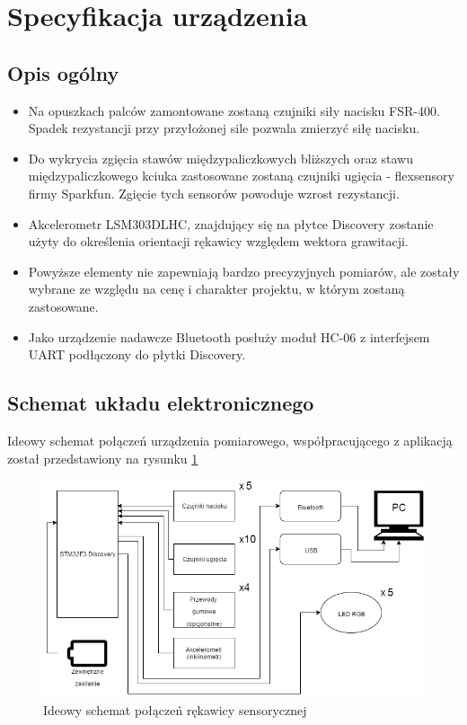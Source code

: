 \documentclass[12pt,a4paper]{article}
\begin{document}
\section{Specyfikacja urządzenia}

\subsection{Opis ogólny}
\begin{itemize}
\item Na opuszkach palców zamontowane zostaną czujniki siły nacisku FSR-400. Spadek rezystancji przy przyłożonej sile pozwala zmierzyć siłę nacisku.
\item Do wykrycia zgięcia stawów międzypaliczkowych bliższych oraz stawu międzypaliczkowego kciuka zastosowane zostaną czujniki ugięcia - flexsensory firmy Sparkfun. Zgięcie tych sensorów powoduje wzrost rezystancji.
\item Akcelerometr LSM303DLHC, znajdujący się na płytce Discovery zostanie użyty do określenia orientacji rękawicy względem wektora grawitacji.
\item Powyższe elementy nie zapewniają bardzo precyzyjnych pomiarów, ale zostały wybrane ze względu na cenę i charakter projektu, w którym zostaną zastosowane.
\item Jako urządzenie nadawcze Bluetooth posłuży moduł HC-06 z interfejsem UART podłączony do płytki Discovery.
\end{itemize}

\subsection{Schemat układu elektronicznego}
Ideowy schemat połączeń urządzenia pomiarowego, współpracującego z aplikacją został przedstawiony na rysunku \ref{fig:ideascheme}
\begin{figure}[!htb]
\centering
\includegraphics[width=\textwidth]{./SchematIdeowy.png}
\caption{Ideowy schemat połączeń rękawicy sensorycznej\label{fig:ideascheme}}
\end{figure}
\end{document}
